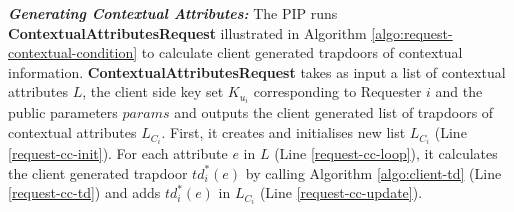 \documentclass[final,5p,times,twocolumn]{elsarticle}
\begin{document}
\emph{\textbf{Generating Contextual Attributes:}} 
The PIP runs \textbf{ContextualAttributesRequest} illustrated in Algorithm \ref{algo:request-contextual-condition} to calculate client generated trapdoors of contextual information. \textbf{ContextualAttributesRequest} takes as input a list of contextual attributes $L$, the client side key set $K_{u_i}$ corresponding to Requester $i$ and the public parameters $params$ and outputs the client generated list of trapdoors of contextual attributes $L_{C_i}$. First, it creates and initialises new list $L_{C_i}$ (Line \ref{request-cc-init}). For each attribute $e$ in $L$ (Line \ref{request-cc-loop}), it calculates the client generated trapdoor $td^*_i (e)$ by calling Algorithm \ref{algo:client-td} (Line \ref{request-cc-td}) and adds $td^*_i (e)$ in $L_{C_i}$ (Line \ref{request-cc-update}).
\end{document}
